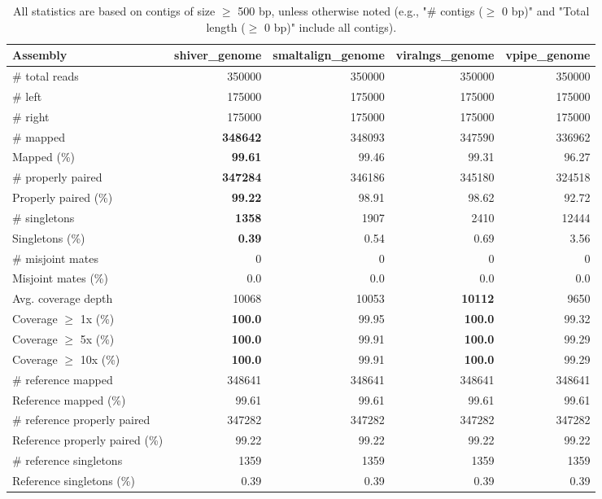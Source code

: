 \documentclass[12pt,a4paper]{article}
\begin{document}
\begin{table}[ht]
\begin{center}
\caption{All statistics are based on contigs of size $\geq$ 500 bp, unless otherwise noted (e.g., "\# contigs ($\geq$ 0 bp)" and "Total length ($\geq$ 0 bp)" include all contigs).}
\begin{tabular}{|l*{4}{|r}|}
\hline
Assembly & shiver\_genome & smaltalign\_genome & viralngs\_genome & vpipe\_genome \\ \hline
\# total reads & 350000 & 350000 & 350000 & 350000 \\ \hline
\# left & 175000 & 175000 & 175000 & 175000 \\ \hline
\# right & 175000 & 175000 & 175000 & 175000 \\ \hline
\# mapped & {\bf 348642} & 348093 & 347590 & 336962 \\ \hline
Mapped (\%) & {\bf 99.61} & 99.46 & 99.31 & 96.27 \\ \hline
\# properly paired & {\bf 347284} & 346186 & 345180 & 324518 \\ \hline
Properly paired (\%) & {\bf 99.22} & 98.91 & 98.62 & 92.72 \\ \hline
\# singletons & {\bf 1358} & 1907 & 2410 & 12444 \\ \hline
Singletons (\%) & {\bf 0.39} & 0.54 & 0.69 & 3.56 \\ \hline
\# misjoint mates & 0 & 0 & 0 & 0 \\ \hline
Misjoint mates (\%) & 0.0 & 0.0 & 0.0 & 0.0 \\ \hline
Avg. coverage depth & 10068 & 10053 & {\bf 10112} & 9650 \\ \hline
Coverage $\geq$ 1x (\%) & {\bf 100.0} & 99.95 & {\bf 100.0} & 99.32 \\ \hline
Coverage $\geq$ 5x (\%) & {\bf 100.0} & 99.91 & {\bf 100.0} & 99.29 \\ \hline
Coverage $\geq$ 10x (\%) & {\bf 100.0} & 99.91 & {\bf 100.0} & 99.29 \\ \hline
\# reference mapped & 348641 & 348641 & 348641 & 348641 \\ \hline
Reference mapped (\%) & 99.61 & 99.61 & 99.61 & 99.61 \\ \hline
\# reference properly paired & 347282 & 347282 & 347282 & 347282 \\ \hline
Reference properly paired (\%) & 99.22 & 99.22 & 99.22 & 99.22 \\ \hline
\# reference singletons & 1359 & 1359 & 1359 & 1359 \\ \hline
Reference singletons (\%) & 0.39 & 0.39 & 0.39 & 0.39 \\ \hline

\end{tabular}
\end{center}
\end{table}
\end{document}
